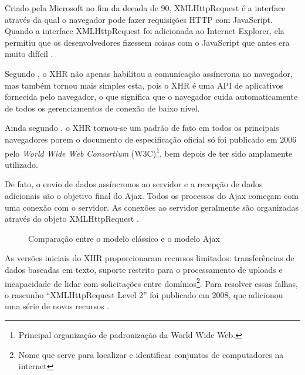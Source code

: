 Criado pela Microsoft no fim da decada de 90, XMLHttpRequest é a interface através da qual o navegador pode fazer requisições HTTP com JavaScript. Quando a interface XMLHttpRequest foi adicionada ao Internet Explorer, ela permitiu que os desenvolvedores fizessem coisas com o JavaScript que antes era muito difícil \cite{haverbeke2014eloquent}.

Segundo , o XHR não apenas habilitou a comunicação assíncrona no navegador, mas também tornou mais simples esta, pois o XHR é uma API de aplicativos fornecida pelo navegador, o que significa que o navegador cuida automaticamente de todos os gerenciamentos de conexão de baixo nível.

Ainda segundo , o XHR tornou-se um padrão de fato em todos os principais navegadores porem o documento de especificação oficial só foi publicado em 2006 pelo \emph{World Wide Web Consortium} (W3C)\footnote{Principal organização de padronização da World Wide Web.}, bem depois de ter sido amplamente utilizado.

De fato, o envio de dados assíncronos ao servidor e a recepção de dados adicionais são o objetivo final do Ajax. Todos os processos do Ajax começam com uma conexão com o servidor. As conexões ao servidor geralmente são organizadas através do objeto XMLHttpRequest \cite{resig2007pro}.

\begin{figure}[H]
	\centering
	\caption{Comparação entre o modelo clássico e o modelo Ajax}
	\hfill
	\label{defaultVsAjax}
\end{figure}

\begin{citacao}
	As versões iniciais do XHR proporcionaram recursos limitados: transferências de dados baseadas em texto, suporte restrito para o processamento de uploads e incapacidade de lidar com solicitações entre domínios\footnote{Nome que serve para localizar e identificar conjuntos de computadores na internet}. Para resolver essas falhas, o rascunho “XMLHttpRequest Level 2” foi publicado em 2008, que adicionou uma série de novos recursos \cite[P.~262-263]{grigorik2013high}.
\end{citacao}

